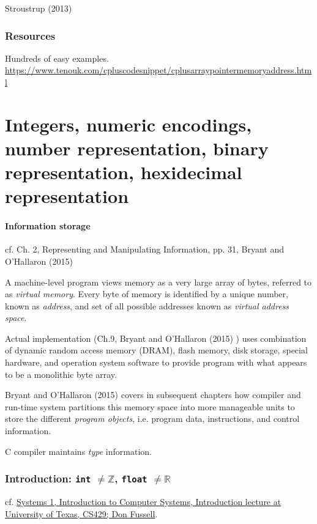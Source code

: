 \documentclass[10pt]{amsart}
\begin{document}
\begin{multicols*}{2}
Stroustrup (2013) \cite{Stro2013}

\section{Resources}

Hundreds of easy examples.
\url{https://www.tenouk.com/cpluscodesnippet/cplusarraypointermemoryaddress.html}

\part{Integers, numeric encodings, number representation, binary representation, hexidecimal representation}


\subsection{Information storage}

cf. Ch. 2, Representing and Manipulating Information, pp. 31, Bryant and O'Hallaron (2015) \cite{BrOH2016}

A machine-level program views memory as a very large array of bytes, referred to as \emph{virtual memory}. Every byte of memory is identified by a unique number, known as \emph{address}, and set of all possible addresses known as \emph{virtual address space}. 

Actual implementation (Ch.9, Bryant and O'Hallaron (2015) \cite{BrOH2016}) uses combination of dynamic random access memory (DRAM), flash memory, disk storage, special hardware, and operation system software to provide program with what appears to be a monolithic byte array.

Bryant and O'Hallaron (2015) \cite{BrOH2016} covers in subsequent chapters how compiler and run-time system partitions this memory space into more manageable units to store the different \emph{program objects}, i.e. program data, instructions, and control information.

C compiler maintains \emph{type} information.




\section{Introduction: \texttt{int} $\neq \mathbb{Z}$, \texttt{float} $\neq \mathbb{R}$}

cf. \href{https://www.cs.utexas.edu/users/fussell/courses/cs429h/lectures/Lecture_1-429h.pdf}{Systems 1, Introduction to Computer Systems, Introduction lecture at University of Texas, CS429; Don Fussell}.


\end{multicols*}
\end{document}
